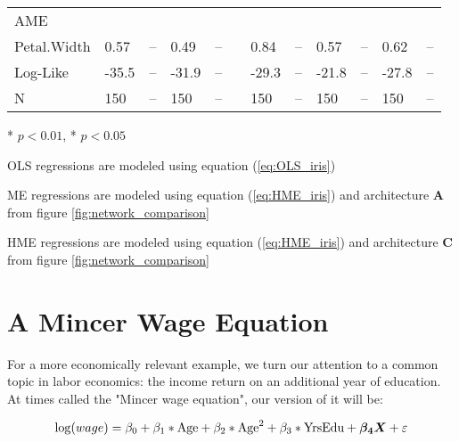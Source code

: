 \documentclass[12pt]{article}
\begin{document}
\begin{landscape}
\begin{table}
\begin{threeparttable}
\begin{tabular}[l]{l l l l l l l l l l l l}
  AME \\
  \cmidrule(r){1-1}
  Petal.Width        & 0.57 & --     & 0.49 & --     && 0.84  & --     & 0.57 & --     & 0.62 & --         \\[0.3cm]


  Log-Like           & -35.5 & --    & -31.9 & --    && -29.3  & --    & -21.8& --     & -27.8 & -- \\
  N                  & 150   & --    & 150   & --    && 150    & --    & 150  & --     & 150   & -- \\

	\hline
		\end{tabular}
		\begin{tablenotes}
			\item{\footnotesize ** $p < 0.01$, * $p < 0.05$}
			\item{\footnotesize OLS regressions are modeled using equation (\ref{eq:OLS_iris})}
			\item{\footnotesize ME regressions are modeled using equation (\ref{eq:HME_iris}) and architecture $\boldsymbol{A}$ from figure \ref{fig:network_comparison}}
			\item{\footnotesize HME regressions are modeled using equation (\ref{eq:HME_iris}) and architecture $\boldsymbol{C}$ from figure \ref{fig:network_comparison}}
		\end{tablenotes} \label{tbl:Iris}
	\end{threeparttable}
\end{table}
\end{landscape}




\section{A Mincer Wage Equation}

For a more economically relevant example, we turn our attention to a common
topic in labor economics: the income return on an additional year of
education. At times called the "Mincer wage equation", our version of it
will be:

\begin{equation} \label{eq:mincer_equ}
  \log (wage) = \beta_{0} + \beta_{1} * \textnormal{Age} + \beta_{2} * \textnormal{Age}^{2} + \beta_{3} * \textnormal{YrsEdu} + \boldsymbol{\beta_{4}}\boldsymbol{X} + \varepsilon
\end{equation}
\end{document}

